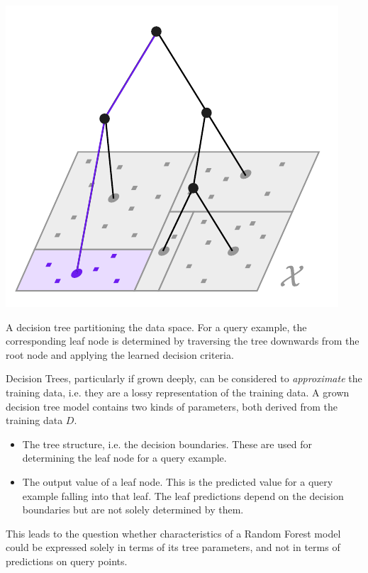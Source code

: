 \documentclass[../main.tex]{subfiles}
\begin{document}
\begin{marginfigure}
    \includegraphics[width=\textwidth]{figma-illustrations/tree-partition.pdf}
    \label{fig:tree-partition}
    \caption{A decision tree partitioning the data space. For a query example, the corresponding leaf node is determined by traversing the tree downwards from the root node and applying the learned decision criteria.}
\end{marginfigure}

Decision Trees, particularly if grown deeply, can be considered to \textit{approximate} the training data, i.e. they are a lossy representation of the training data. A grown decision tree model contains two kinds of parameters, both derived from the training data $D$.
\begin{itemize}
\item The tree structure, i.e. the decision boundaries. These are used for determining the leaf node for a query example.
\item The output value of a leaf node. This is the predicted value for a query example falling into that leaf. The leaf predictions depend on the decision boundaries but are not solely determined by them. 
\end{itemize}
This leads to the question whether characteristics of a Random Forest model could be expressed solely in terms of its tree parameters, and not in terms of predictions on query points.
\end{document}

